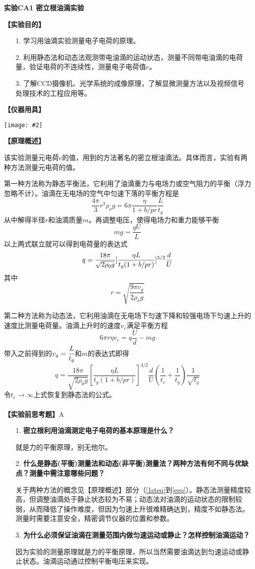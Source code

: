 \documentclass[11pt,a4paper]{ctexart}
\newcommand{\ExpeName}{实验CA1 密立根油滴实验}
\newcommand{\cpic}[2]{
\begin{center}
\texttt{[image: \#2]}
\end{center}
}
\newcommand{\beq}{\begin{equation}}
\newcommand{\eeq}{\end{equation}}
\begin{document}
\newpage%
\begin{center}
\LARGE{\textbf{\ExpeName}}
\end{center}
\textbf{【实验目的】}
\begin{enumerate}
 \item[1.] 学习用油滴实验测量电子电荷的原理。
 \item[2.] 利用静态法和动态法观测带电油滴的运动状态，测量不同带电油滴的电荷量，验证电荷的不连续性，测量电子电荷值$e$。
 \item[3.] 了解CCD摄像机、光学系统的成像原理，了解显微测量方法以及视频信号处理技术的工程应用等。
\end{enumerate}
\textbf{【仪器用具】}
\cpic{0.3}{t1}
\textbf{【原理概述】}\par
该实验测量元电荷$e$的值，用到的方法著名的密立根油滴法。具体而言，实验有两种方法测量元电荷的值。
\par
第一种方法称为静态平衡法，它利用了油滴重力与电场力或空气阻力的平衡（浮力忽略不计）。油滴在无电场的空气中匀速下落的平衡方程是
\beq \label{1steq}
\frac{4\pi}{3}r^3 \rho_o g = 6\pi \frac{\eta}{1 + b/p r} \frac{L}{t_g}
\eeq
从中解得半径$r$和油滴质量$m$。再调整电压，使得电场力和重力能够平衡
\beq
mg = \frac{qU}{L}
\eeq
以上两式联立就可以得到电荷量的表达式
\beq \label{staq}
q = \frac{18\pi}{\sqrt{2\rho_0 g}}[\frac{\eta L}{t_g (1 + b/p r)}]^{3/2} \frac{d}{U} \\
\eeq
其中
\beq
r = \sqrt{\frac{9\pi v_g}{2\rho_o g}}
\eeq
\par
第二种方法称为动态法，它利用油滴在无电场下匀速下降和较强电场下匀速上升的速度比测量电荷量。油滴上升时的速度$v_e$满足平衡方程
\beq
6\pi r \eta v_e = q\frac{U}{d} - mg
\eeq
带入之前得到的$v_g = \cfrac{L}{t_g}$和$m$的表达式即得
\beq \label{dynq}
q = \frac{18\pi}{\sqrt{2\rho_0 g}}[\frac{\eta L}{t_g (1 + b/p r)}]^{3/2} \frac{d}{U} (\frac{1}{t_e} +\frac{1}{t_g}) \frac{1}{\sqrt{t_g}}
\eeq
令$t_e \to \infty$上式恢复到静态法的公式。
\\
\ 
\\
\textbf{【实验前思考题】}A
\begin{enumerate}
 \item[1.] \textbf{密立根利用油滴测定电子电荷的基本原理是什么？}\par
就是力的平衡原理，别无他尔。
 \item[2.] \textbf{什么是静态(平衡)测量法和动态(非平衡)测量法？两种方法有何不同与优缺点？测量中需注意哪些问题？}\par
关于两种方法的概念见【原理概述】部分（\cref{1steq}到\cref{eeq}）。静态法测量精度较高，但调整油滴处于静止状态较为不易；动态法对油滴的运动状态的限制较弱，从而降低了操作难度，但因为匀速上升很难精确达到，精度不如静态法。测量时需要注意安全，精密调节仪器的位置和参数。
\item[3.] \textbf{为什么必须保证油滴在测量范围内做匀速运动或静止？怎样控制油滴运动？}\par
因为实验的测量原理就是力的平衡原理，所以当然需要油滴达到匀速运动或静止状态。油滴运动通过控制平衡电压来实现。
\end{enumerate}
\end{document}
